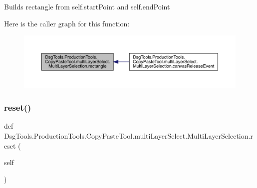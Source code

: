 \begin{DoxyVerb}Builds rectangle from self.startPoint and self.endPoint
\end{DoxyVerb}
 Here is the caller graph for this function\+:
\nopagebreak
\begin{figure}[H]
\begin{center}
\leavevmode
\includegraphics[width=350pt]{class_dsg_tools_1_1_production_tools_1_1_copy_paste_tool_1_1multi_layer_select_1_1_multi_layer_selection_acce42c0397d317ed7cd7958ab15b2f42_icgraph}
\end{center}
\end{figure}
\mbox{\label{class_dsg_tools_1_1_production_tools_1_1_copy_paste_tool_1_1multi_layer_select_1_1_multi_layer_selection_afde909a70b5cdef7ece12d9c51f0218d}} 
\subsubsection{\texorpdfstring{reset()}{reset()}}
{\footnotesize\ttfamily def Dsg\+Tools.\+Production\+Tools.\+Copy\+Paste\+Tool.\+multi\+Layer\+Select.\+Multi\+Layer\+Selection.\+reset (\begin{DoxyParamCaption}\item[{}]{self }\end{DoxyParamCaption})}

